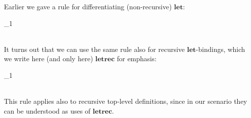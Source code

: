 Earlier we gave a rule for differentiating (non-recursive) \ensuremath{\mathbf{let}}:
\begin{hscode}\SaveRestoreHook
{}%
%
%
%
%
%
%
\>[B]{}\<[29]%
\>[29]{}\mathrel{=}{}\<[29E]%
\>[32]{}\;{}\<[38]%
\>[38]{}\<[42]%
\>[42]{}\mathrel{=}_{1}{}\<[E]%
\\
\>[38]{}\<[42]%
\>[42]{}\mathrel{=}\<[E]%
\\
\>[32]{}\;{}\<[38]%
\>[38]{}\<[E]%
\ColumnHook
\end{hscode}\resethooks
It turns out that we can use the same rule also for recursive
\ensuremath{\mathbf{let}}-bindings, which we write here (and only here) \ensuremath{\mathbf{letrec}} for emphasis:
\begin{hscode}\SaveRestoreHook
{}%
%
%
%
%
%
%
\>[B]{}\<[31]%
\>[31]{}\mathrel{=}{}\<[31E]%
\>[34]{}\;{}\<[42]%
\>[42]{}\<[46]%
\>[46]{}\mathrel{=}_{1}{}\<[E]%
\\
\>[42]{}\<[46]%
\>[46]{}\mathrel{=}\<[E]%
\\
\>[34]{}\;{}\<[42]%
\>[42]{}\<[E]%
\ColumnHook
\end{hscode}\resethooks
This rule applies also to recursive top-level definitions, since in our scenario
they can be understood as uses of \ensuremath{\mathbf{letrec}}.

